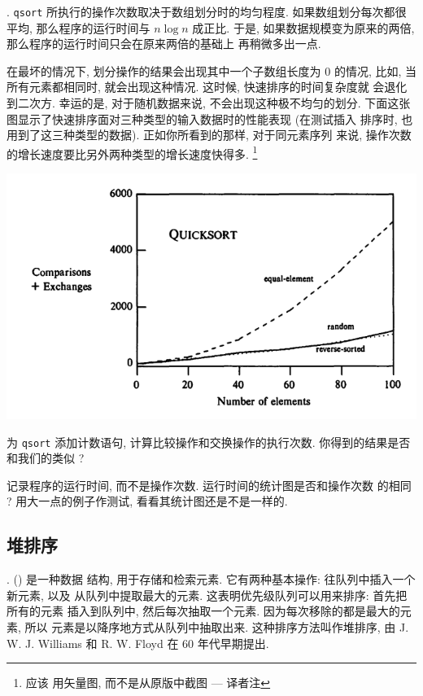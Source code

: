 . \texttt{qsort} 所执行的操作次数取决于数组划分时的均匀程度.
如果数组划分每次都很平均, 那么程序的运行时间与 $n \log n$ 成正比.
于是, 如果数据规模变为原来的两倍, 那么程序的运行时间只会在原来两倍的基础上
再稍微多出一点.

在最坏的情况下, 划分操作的结果会出现其中一个子数组长度为 0 的情况, 比如,
当所有元素都相同时, 就会出现这种情况. 这时候, 快速排序的时间复杂度就
会退化到二次方. 幸运的是, 对于随机数据来说, 不会出现这种极不均匀的划分. 
下面这张图显示了快速排序面对三种类型的输入数据时的性能表现 (在测试插入
排序时, 也用到了这三种类型的数据). 正如你所看到的那样, 对于同元素序列
来说, 操作次数的增长速度要比另外两种类型的增长速度快得多. \footnote{应该 
用矢量图, 而不是从原版中截图 --- 译者注}

\begin{center}
    \includegraphics[scale=0.7]{images/quicksort.png}
\end{center}

\begin{exercise}
    为 \texttt{qsort} 添加计数语句, 计算比较操作和交换操作的执行次数.
    你得到的结果是否和我们的类似 ?
\end{exercise}

\begin{exercise}
    记录程序的运行时间, 而不是操作次数. 运行时间的统计图是否和操作次数
    的相同 ? 用大一点的例子作测试, 看看其统计图还是不是一样的.
\end{exercise}

\subsection{堆排序}
\label{subsec:heapsort}

.  () 是一种数据
结构, 用于存储和检索元素. 它有两种基本操作: 往队列中插入一个新元素, 以及 
从队列中提取最大的元素. 这表明优先级队列可以用来排序: 首先把所有的元素
插入到队列中, 然后每次抽取一个元素. 因为每次移除的都是最大的元素, 所以 
元素是以降序地方式从队列中抽取出来. 这种排序方法叫作堆排序, 由
J. W. J. Williams 和 R. W. Floyd 在 60 年代早期提出.

